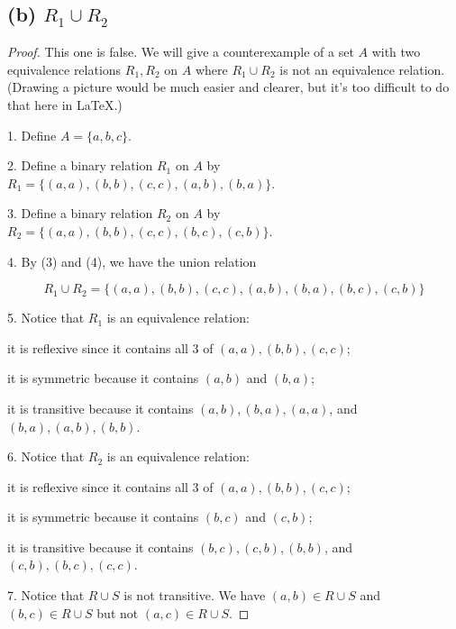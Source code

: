 \documentclass[14pt]{extarticle}
\begin{document}
\subsection{(b) $R_1 \cup R_2$} 
\begin{proof}
This one is false. We will give a counterexample of a set $A$ with two equivalence relations $R_1, R_2$ on $A$ where $R_1 \cup R_2$ is not an equivalence relation. (Drawing a picture would be much easier and clearer, but it's too difficult to do that here in \LaTeX.)

1. Define $A = \{a,b,c\}$.

2. Define a binary relation $R_1$ on $A$ by $R_1 = \{(a,a), (b,b), (c,c), (a,b), (b,a)\}$.

3. Define a binary relation $R_2$ on $A$ by $R_2 = \{(a,a),(b,b),(c,c),(b,c),(c,b)\}$.

4. By (3) and (4), we have the union relation 

$$
R_1 \cup R_2 = \{(a,a), (b,b), (c,c), (a,b), (b,a), (b,c),(c,b)\}
$$

5. Notice that $R_1$ is an equivalence relation:

it is reflexive since it contains all 3 of $(a,a), (b,b), (c,c)$;

it is symmetric because it contains $(a,b)$ and $(b,a)$;

it is transitive because it contains $(a,b),(b,a),(a,a)$, and $(b,a),(a,b),(b,b)$.

6. Notice that $R_2$ is an equivalence relation:

it is reflexive since it contains all 3 of $(a,a), (b,b), (c,c)$;

it is symmetric because it contains $(b,c)$ and $(c,b)$;

it is transitive because it contains $(b,c),(c,b),(b,b)$, and $(c,b),(b,c),(c,c)$.

7. Notice that $R \cup S$ is not transitive. We have $(a,b) \in R \cup S$ and $(b,c) \in R \cup S$ but not $(a,c) \in R \cup S$.
\end{proof}
\end{document}
